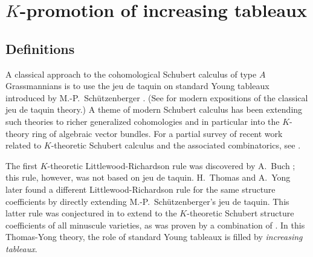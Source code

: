 \documentclass[12pt]{amsart}
\newtheorem{proposition}[theorem]{Proposition}
\theoremstyle{definition}
\theoremstyle{remark}
\numberwithin{equation}{section}
\newcommand{\mot}{\ensuremath{\mathsf{Mot}}}
\begin{document}
%
%

\section{$K$-promotion of increasing tableaux}\label{sec:Kpromotion}

\subsection{Definitions}\label{sec:Kpro_defs}
A classical approach to the cohomological Schubert calculus of type $A$ Grassmannians is to use the jeu de taquin on standard Young tableaux introduced by M.-P.~Sch\"utzenberger \cite{Schutzenberger:jdt}. (See \cite{Fulton, Manivel} for modern expositions of the classical jeu de taquin theory.) A theme of modern Schubert calculus has been extending such theories to richer generalized cohomologies and in particular into the $K$-theory ring of algebraic vector bundles. For a partial survey of recent work related to $K$-theoretic Schubert calculus and the associated combinatorics, see \cite{Pechenik.Yong:genomic}.

The first $K$-theoretic Littlewood-Richardson rule was discovered by A.~Buch \cite{Buch}; this rule, however, was not based on jeu de taquin. H.~Thomas and A.~Yong \cite{Thomas.Yong:K} later found a different Littlewood-Richardson rule for the same structure coefficients by directly extending M.-P.~Sch\"utzenberger's jeu de taquin. This latter rule was conjectured in \cite{Thomas.Yong:K} to extend to the $K$-theoretic Schubert structure coefficients of all minuscule varieties, as was proven by a combination of \cite{Buch.Ravikumar,Clifford.Thomas.Yong,Buch.Samuel}. In this Thomas-Yong theory, the role of standard Young tableaux is filled by \emph{increasing tableaux}.
\end{document}
